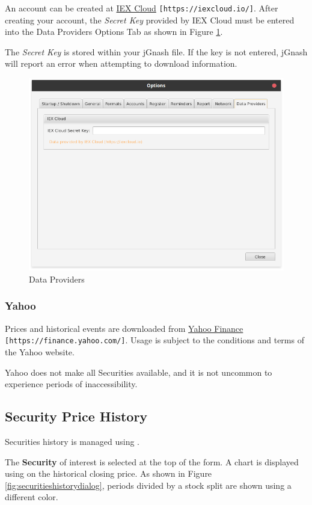 \documentclass[letterpaper,12pt]{book}
\begin{document}
    An account can be created at \href{https://iexcloud.io/}{IEX Cloud} \texttt{[https://iexcloud.io/]}.
    After creating your account, the \textit{Secret Key} provided by IEX Cloud must be entered into the 
    Data Providers Options Tab as shown in Figure \ref{fig:dataproviders}.  
    
    The \textit{Secret Key} is stored within your jGnash file.  If the key is not entered,
    jGnash will report an error when attempting to download information.
    
    \begin{figure}[h]
        \caption{Data Providers}
        \label{fig:dataproviders}
        \includegraphics[width=0.6\linewidth]{images/dataProvidersTab}
    \end{figure}
    
    \subsubsection{Yahoo}
    Prices and historical events are downloaded from \href{https://finance.yahoo.com/}{Yahoo Finance} \texttt{[https://finance.yahoo.com/]}.
    Usage is subject to the conditions and terms of the Yahoo website.
    
    Yahoo does not make all Securities available, and it is not uncommon to experience periods of inaccessibility.
    
    \subsection{Security Price History}
    
    Securities history is managed using .
    
    The \textbf{Security} of interest is selected at the top of the form.
    A chart is displayed using on the historical closing price.  
    As shown in Figure \ref{fig:securitieshistorydialog}, periods divided by a stock split 
    are shown using a different color.
    
\end{document}
